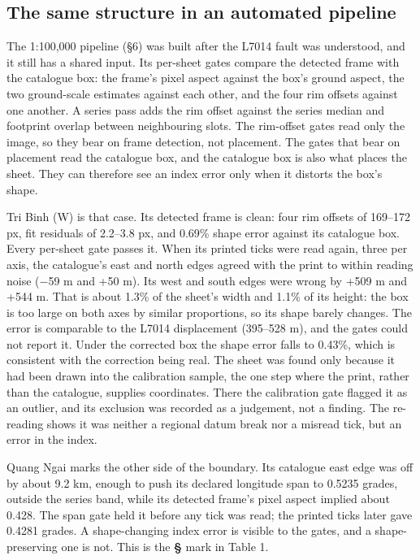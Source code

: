 \documentclass[11pt,a4paper]{article}
\begin{document}
\subsection{The same structure in an automated pipeline}

The 1:100,000 pipeline (§6) was built after the L7014 fault was understood, and it still has a shared input. Its per-sheet gates compare the detected frame with the catalogue box: the frame's pixel aspect against the box's ground aspect, the two ground-scale estimates against each other, and the four rim offsets against one another. A series pass adds the rim offset against the series median and footprint overlap between neighbouring slots. The rim-offset gates read only the image, so they bear on frame detection, not placement. The gates that bear on placement read the catalogue box, and the catalogue box is also what places the sheet. They can therefore see an index error only when it distorts the box's shape.

Tri Binh (W) is that case. Its detected frame is clean: four rim offsets of 169–172 px, fit residuals of 2.2–3.8 px, and 0.69\% shape error against its catalogue box. Every per-sheet gate passes it. When its printed ticks were read again, three per axis, the catalogue's east and north edges agreed with the print to within reading noise (−59 m and +50 m). Its west and south edges were wrong by +509 m and +544 m. That is about 1.3\% of the sheet's width and 1.1\% of its height: the box is too large on both axes by similar proportions, so its shape barely changes. The error is comparable to the L7014 displacement (395–528 m), and the gates could not report it. Under the corrected box the shape error falls to 0.43\%, which is consistent with the correction being real. The sheet was found only because it had been drawn into the calibration sample, the one step where the print, rather than the catalogue, supplies coordinates. There the calibration gate flagged it as an outlier, and its exclusion was recorded as a judgement, not a finding. The re-reading shows it was neither a regional datum break nor a misread tick, but an error in the index.

Quang Ngai marks the other side of the boundary. Its catalogue east edge was off by about 9.2 km, enough to push its declared longitude span to 0.5235 grades, outside the series band, while its detected frame's pixel aspect implied about 0.428. The span gate held it before any tick was read; the printed ticks later gave 0.4281 grades. A shape-changing index error is visible to the gates, and a shape-preserving one is not. This is the \textbf{§} mark in Table 1.
\end{document}

